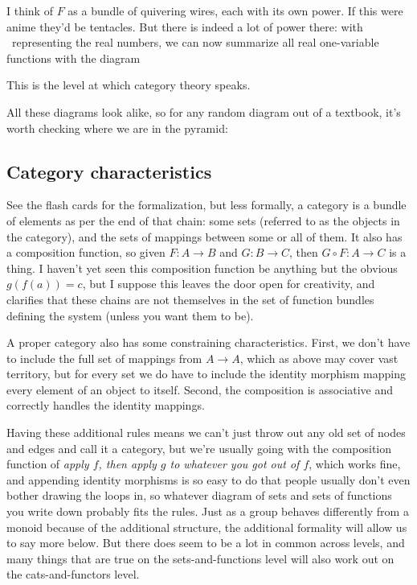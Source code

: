 \documentclass[11pt]{article}
\begin{document}

I think of $F$ as a bundle of quivering wires, each with its own power. If this were anime
they'd be tentacles. But there is indeed a lot of power there: with \Re\ representing the
real numbers, we can now summarize all real one-variable functions with the diagram 

This is the level at which category theory speaks.

All these diagrams look alike, so for any random diagram out of a textbook, it's
worth checking where we are in the pyramid:

\subsection{Category characteristics}
See the flash cards for the formalization, but less formally,
a category is a bundle of elements as per the end of that chain: some sets
(referred to as the objects in the category), and the sets of mappings between some
or all of them.  It also has a composition function, so given $F:A\to B$
and $G:B\to C$, then $G\circ F:A\to C$ is a thing. I haven't yet seen this composition
function be anything but the obvious $g(f(a)) = c$, but I suppose this leaves the door
open for creativity, and clarifies that these chains are not themselves in the set of
function bundles defining the system (unless you want them to be).

A proper category also has some
constraining characteristics. First, we don't have to include the full set of mappings from
$A\to A$, which as above may cover vast territory, but for every set we do have to include
the identity morphism mapping every element of an object to itself. Second, the composition
is associative and correctly handles the identity mappings.

Having these additional rules means we can't just throw out any old set of nodes and edges
and call it a category, but we're usually going with the composition function of {\em apply $f$, then
apply $g$ to whatever you got out of $f$}, which works fine, and appending identity
morphisms is so easy to do that people usually don't even bother drawing the loops in,
so whatever diagram of sets and sets of functions you write down probably fits the rules.
Just as a group behaves differently from a monoid because of the additional structure,
the additional formality will allow us to say more below. But there does seem to be a
lot in common across levels, and many things that are true on the sets-and-functions
level will also work out on the cats-and-functors level.
\end{document}
